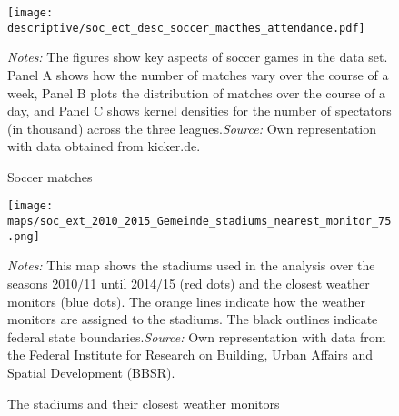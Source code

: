 \documentclass[11pt, a4paper, draft]{article} %
\begin{document}
\vspace*{\fill}
\begin{figure}[H]\centering
	\caption{Soccer matches}\label{fig_soc_ext:descriptives_matches_time_attendance}
	\texttt{[image: descriptive/soc\_ect\_desc\_soccer\_macthes\_attendance.pdf]}	
	\begin{minipage}{\linewidth}
		\scriptsize{\emph{Notes:} The figures show key aspects of soccer games in the data set. Panel A shows how the number of matches vary over the course of a week, Panel B plots the distribution of matches over the course of a day, and Panel C shows kernel densities for the number of spectators (in thousand) across the three leagues.\newline \emph{Source:} Own representation with data obtained from kicker.de.}
	\end{minipage}
\end{figure}
\vspace*{\fill}\clearpage





\vspace*{\fill}
\begin{figure}[H]\centering
	\caption{The stadiums and their closest weather monitors}\label{fig_soc_ext:map_gem_stadiums_nearest_monitor}
	\texttt{[image: maps/soc\_ext\_2010\_2015\_Gemeinde\_stadiums\_nearest\_monitor\_75.png]}
	\begin{minipage}{0.95\linewidth}
		\scriptsize{\emph{Notes:} This map shows the stadiums used in the analysis over the seasons 2010/11 until 2014/15 (red dots) and the closest weather monitors (blue dots). The orange lines indicate how the weather monitors are assigned to the stadiums. The black outlines indicate federal state boundaries.\newline \emph{Source:} Own representation with data from the Federal Institute for Research on Building, Urban Affairs and Spatial Development (BBSR).}
	\end{minipage}
\end{figure}
\vspace*{\fill}\clearpage
\end{document}
